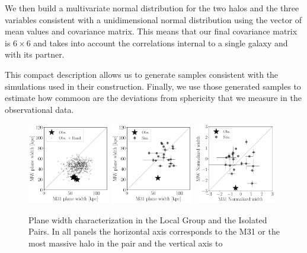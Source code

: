 \documentclass[a4paper,fleqn,usenatbib]{mnras}
\begin{document}
We then build a multivariate normal distribution for the two halos and
the three variables consistent with a unidimensional normal
distribution using the vector of mean values and covariance matrix.
This means that our final covariance matrix is $6\times 6$ and takes
into account the correlations internal to a single galaxy and with its
partner. 

This compact description allows us to generate samples consistent with
the simulations used in their construction.
Finally, we use those generated samples to estimate how commoon are
the deviations from sphericity that we measure in the observational
data. 





\begin{figure}
\centering
\includegraphics[width=0.32\textwidth]{scatter_random_ranked_width.pdf}
\includegraphics[width=0.32\textwidth]{scatter_ranked_width.pdf}
\includegraphics[width=0.32\textwidth]{scatter_norm_ranked_width.pdf}
\caption{Plane width characterization in the Local Group and the
  Isolated Pairs. In all panels the horizontal axis corresponds to the
  M31 or the most massive halo in the pair and the vertical axis to
}
\end{figure}
\end{document}

